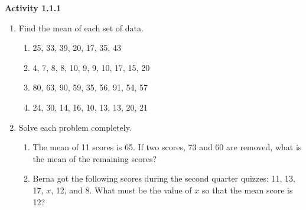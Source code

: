 \vspace{1ex}
\noindent\textbf{Activity 1.1.1}

\vspace{0.75ex}

\begin{enumerate}[label = \Alph*. ]
\item Find the mean of each set of data.
\begin{enumerate}[label = \arabic*. ]
\item 25, 33, 39, 20, 17, 35, 43
\item 4, 7, 8, 8, 10, 9, 9, 10, 17, 15, 20
\item 80, 63, 90, 59, 35, 56, 91, 54, 57
\item 24, 30, 14, 16, 10, 13, 13, 20, 21

\end{enumerate}  

\item Solve each problem completely. 
\begin{enumerate}[label = \arabic*. ]
\item The mean of 11 scores is 65. If two scores, 73 and 60 are removed, what is the mean of the remaining scores?
\item Berna got the following scores during the second  quarter quizzes: 11, 13, 17, $x$, 12, and 8. What must be the value of $x$ so that the mean score is 12?

\end{enumerate}   

\end{enumerate} 